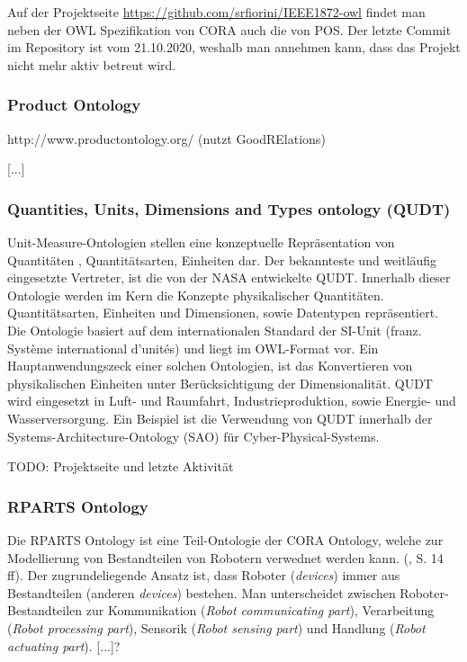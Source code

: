 \documentclass{article}
\begin{document}
Auf der Projektseite \url{https://github.com/srfiorini/IEEE1872-owl} findet man neben der OWL Spezifikation von CORA auch die von POS. Der letzte Commit im Repository ist vom 21.10.2020, weshalb man annehmen kann, dass das Projekt nicht mehr aktiv betreut wird.

\subsubsection{Product Ontology}

http://www.productontology.org/ (nutzt GoodRElations)

[...]

\subsubsection{Quantities, Units, Dimensions and Types ontology (QUDT)}

Unit-Measure-Ontologien stellen eine konzeptuelle Repräsentation von Quantitäten , Quantitätsarten, Einheiten dar. Der bekannteste und weitläufig eingesetzte Vertreter, ist die von der NASA entwickelte QUDT\cite{QUDTOntology}. Innerhalb dieser Ontologie werden im Kern die Konzepte physikalischer Quantitäten. Quantitätsarten, Einheiten und Dimensionen, sowie Datentypen repräsentiert. Die Ontologie basiert auf dem internationalen Standard der SI-Unit (franz. Système international d'unités) und liegt im OWL-Format vor. Ein Hauptanwendungszeck einer solchen Ontologien, ist das Konvertieren von physikalischen  Einheiten unter Berücksichtigung der Dimensionalität.
QUDT wird eingesetzt in Luft- und Raumfahrt, Industrieproduktion, sowie Energie- und Wasserversorgung. Ein Beispiel ist die Verwendung von QUDT innerhalb der Systems-Architecture-Ontology (SAO) für Cyber-Physical-Systems.

TODO: Projektseite und letzte Aktivität

\subsubsection{RPARTS Ontology}


Die RPARTS Ontology ist eine Teil-Ontologie der CORA Ontology, welche zur Modellierung von Bestandteilen von Robotern verwednet werden kann. (\cite{fiorini2015extensions}, S. 14 ff).
Der zugrundeliegende Ansatz ist, dass Roboter (\textit{devices}) immer aus Bestandteilen (anderen \textit{devices}) bestehen.
Man unterscheidet zwischen Roboter-Bestandteilen zur Kommunikation (\textit{Robot communicating part}), Verarbeitung (\textit{Robot processing part}), Sensorik (\textit{Robot sensing part}) und Handlung (\textit{Robot actuating part}).
[...]?
\end{document}
